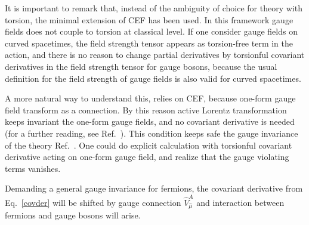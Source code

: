
It is important to remark that, instead of the ambiguity of choice for theory with torsion, the minimal extension of CEF has been used. In this framework gauge fields does not couple to torsion at classical level. If one consider gauge fields on curved spacetimes, the field strength tensor appears as torsion-free term in the action, and there is no reason to change partial derivatives by torsionful covariant derivatives in the field strength tensor for gauge bosons, because the usual definition for the field strength of gauge fields is also valid for curved spacetimes. 

A more natural way to understand this, relies on CEF, because one-form gauge field transform as a connection. By this reason active Lorentz transformation keeps invariant the one-form gauge fields, and no covariant derivative is needed (for a further reading, see Ref.~\cite{Benn:1980ea}). This condition keeps safe the gauge invariance of the theory Ref.~\cite[p.407]{Hehl:1976kj}. One could do explicit calculation with torsionful covariant derivative acting on one-form gauge field, and realize that the gauge violating terms vanishes.

Demanding a general gauge invariance for fermions, the covariant derivative from Eq.~\eqref{covder} will be shifted by gauge connection $\hat{V}_{\hat{\mu}}^A$ and interaction between fermions and gauge bosons will arise.

